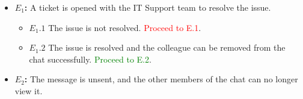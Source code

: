 \documentclass[]{article}
\begin{document}
\begin{enumerate}[\bf {BE}9.]
{{\begin{itemize}
					\item {\bf $E_{1}$:}  A ticket is opened with the IT Support team to resolve the issue.
					      \begin{itemize}
						      \item {\bf $E_{1}.1$} The issue is not resolved. \textcolor{red}{Proceed to E.1}.
						      \item {\bf $E_{1}.2$} The issue is resolved and the colleague can be removed from the chat successfully. \textcolor{green}{Proceed to E.2}.
					      \end{itemize}

					\item {\bf $E_{2}$:}  The message is unsent, and the other members of the chat can no longer view it.

				\end{itemize}
			}%
		}%
\end{enumerate}
\end{document}
